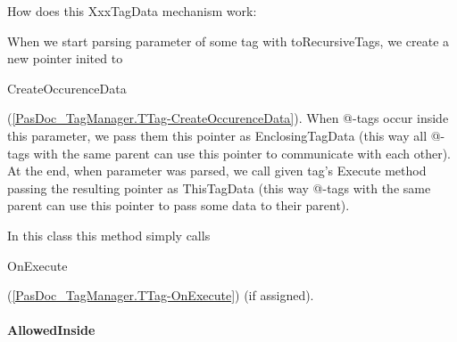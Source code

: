 \documentclass{report}
\begin{document}
\begin{list}{}
How does this XxxTagData mechanism work:

When we start parsing parameter of some tag with toRecursiveTags, we create a new pointer inited to \begin{ttfamily}CreateOccurenceData\end{ttfamily}(\ref{PasDoc_TagManager.TTag-CreateOccurenceData}). When @{-}tags occur inside this parameter, we pass them this pointer as EnclosingTagData (this way all @{-}tags with the same parent can use this pointer to communicate with each other). At the end, when parameter was parsed, we call given tag's Execute method passing the resulting pointer as ThisTagData (this way @{-}tags with the same parent can use this pointer to pass some data to their parent).

In this class this method simply calls \begin{ttfamily}OnExecute\end{ttfamily}(\ref{PasDoc_TagManager.TTag-OnExecute}) (if assigned).

\end{list}
\paragraph*{AllowedInside}\hspace*{\fill}
\end{document}
